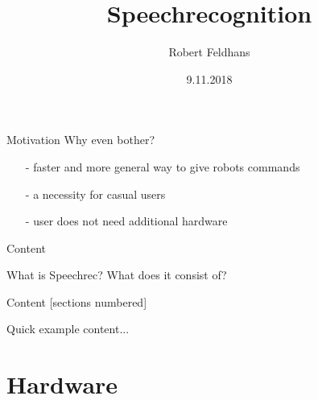 \documentclass{beamer}
\title{Speechrecognition}
\date{9.11.2018}
\author{Robert Feldhans}
\institute{Seminar Robocup}
\begin{document}
	\maketitle
	
	\begin{frame}{Motivation}
		Why even bother?
		\begin{itemize}
			\item[-] faster and more general way to give robots commands
			\item[-] a necessity for casual users
			\item[-] user does not need additional hardware
		\end{itemize}
	\end{frame}
	
	\begin{frame}{Content}
		
		\begin{alertblock}{What is Speechrec? What does it consist of?}
		\end{alertblock}
		
	\end{frame}
	
	\begin{frame}{Content}
		[sections numbered]
		\tableofcontents[hideallsubsections]
	\end{frame}
	
	\begin{frame}{Quick example}
		content...
	\end{frame}
	
	
	\section{Hardware}%
	
\end{document}
